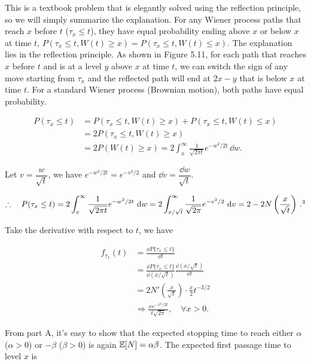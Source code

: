 \begin{solution}
This is a textbook problem that is elegantly solved using the reflection principle, so
we will simply summarize the explanation. For any Wiener process paths that reach $x$
before $t$ ($\tau_x\leq t$), they have equal probability ending above $x$ or below $x$
at time $t$, $P(\tau_x\leq t,W(t)\geq x)=P(\tau_x\leq t,W(t)\leq x)$. The explanation
lies in the reflection principle. As shown in Figure 5.11, for each path that reaches
$x$ before $t$ and is at a level $y$ above $x$ at time $t$, we can switch the sign of any
move starting from $\tau_x$ and the reflected path will end at $2x-y$ that is below $x$
at time $t$. For a standard Wiener process (Brownian motion), both paths have equal
probability.

\[
\begin{aligned}
P(\tau_x\leq t)
 &=P(\tau_x\leq t,W(t)\geq x)+P(\tau_x\leq t,W(t)\leq x)\\
 &=2P(\tau_x\leq t,W(t)\geq x)\\
 &=2P(W(t)\geq x)=2\int_x^\infty
   \frac{1}{\sqrt{2\pi t}}e^{-w^2/2t}\,\dd w.
\end{aligned}
\]

Let $v=\dfrac{w}{\sqrt{t}}$, we have $e^{-w^2/2t}=e^{-v^2/2}$ and
$\dd v=\dfrac{\dd w}{\sqrt{t}}$.

\[
\therefore\quad P(\tau_x\leq t)=2\int_x^\infty\frac{1}{\sqrt{2\pi t}}e^{-w^2/2t}\,\dd w
=2\int_{x/\sqrt{t}}^\infty\frac{1}{\sqrt{2\pi}}e^{-v^2/2}\,\dd v
=2-2N\left(\frac{x}{\sqrt{t}}\right)\,.\footnotemark[3]
\]

Take the derivative with respect to $t$, we have

\[
\begin{aligned}
f_{\tau_x}(t)&=\frac{\dd P\{\tau_x\leq t\}}{\dd t}\\
&=\frac{\dd P\{\tau_x\leq t\}}{\dd(x/\sqrt{t})}
  \frac{\dd(x/\sqrt{t})}{\dd t}\\
&=2N'\left(\frac{x}{\sqrt{t}}\right)\cdot\frac{x}{2}t^{-3/2}\\
&\Longrightarrow\frac{x e^{-x^2/2t}}{t\sqrt{2\pi}},\quad\forall x>0.
\end{aligned}
\]

From part A, it's easy to show that the expected stopping time to reach either
 $\alpha$ ($\alpha>0$) or $-\beta$ ($\beta>0$) is again $\mathbb{E}[N]=\alpha\beta$. The expected
first passage time to level $x$ is



\end{solution}
